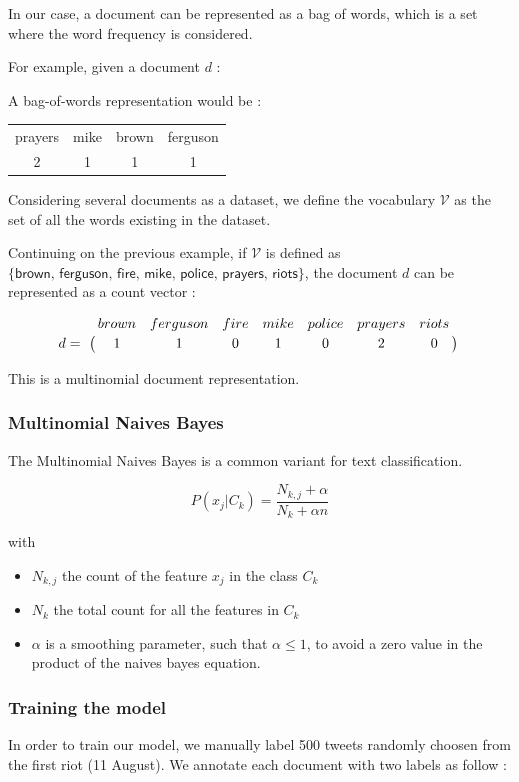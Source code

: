 \documentclass[a4paper,twoside,12pt,openright]{report}
\begin{document}
In our case, a document can be represented as a bag of words, which is a set where the word frequency is considered.

For example, given a document $d$ : 

A bag-of-words representation would be :
\begin{center}
\begin{tabular}{|c|c|c|c|}
prayers & mike & brown & ferguson \\
2 & 1 & 1 & 1
\end{tabular}
\end{center}

Considering several documents as a dataset, we define the vocabulary $\mathcal{V}$ as the set of all the words existing in the dataset.

Continuing on the previous example, if $\mathcal{V}$ is defined as $\{\textsf{brown, ferguson, fire, mike, police, prayers, riots}\}$, the document $d$ can be represented as a count vector :

$$
\bordermatrix{~ & brown & ferguson & fire & mike & police & prayers & riots \cr d =  & 1 & 1 & 0 & 1 & 0 & 2 & 0 \cr}
$$

This is a multinomial document representation.

\subsubsection{Multinomial Naives Bayes}
The Multinomial Naives Bayes is a common variant for text classification.

$$ 
\boxed{P(x_{j}| C_k ) = \frac{N_{k,j} + \alpha}{N_k + \alpha n}}
$$

with 
\begin{itemize}
\item $N_{k,j}$ the count of the feature $x_j$ in the class $C_k$
\item $N_{k}$ the total count for all the features in $C_k$
\item $\alpha$ is a smoothing parameter, such that $\alpha \leq 1$, to avoid a zero value in the product of the naives bayes equation.
\end{itemize}


\subsubsection{Training the model}
In order to train our model, we manually label 500 tweets randomly choosen from the first riot (11 August). We annotate each document with two labels as follow : 
\end{document}
